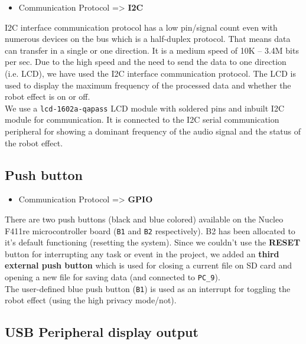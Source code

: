 \documentclass[11pt]{article}
\begin{document}
\begin{itemize}
\item Communication Protocol => \textbf{I2C}
\end{itemize}

I2C interface communication protocol has a low pin/signal count even with numerous devices on the bus which is a half-duplex protocol. That means data can transfer in a single or one direction. It is a medium speed of 10K – 3.4M bits per sec. Due to the high speed and the need to send the data to one direction (i.e. LCD), we have used the I2C interface communication protocol. The LCD is used to display the maximum frequency of the processed data and whether the robot effect is on or off. \\

We use a \texttt{lcd-1602a-qapass} LCD module with soldered pins and inbuilt I2C module for communication. It is connected to the I2C serial communication peripheral for showing a dominant frequency of the audio signal and the status of the robot effect.

\subsection{Push button}
\label{sec:org61b3168}

\begin{itemize}
\item Communication Protocol => \textbf{GPIO}
\end{itemize}

There are two push buttons (black and blue colored) available on the Nucleo F411re microcontroller board (\texttt{B1} and \texttt{B2} respectively). B2 has been allocated to it's default functioning (resetting the system). Since we couldn’t use the \textbf{RESET} button for interrupting any task or event in the project, we added an \textbf{third external push button} which is used for closing a current file on SD card and opening a new file for saving data (and connected to \texttt{PC\_9}). \\

The user-defined blue push button (\texttt{B1}) is used as an interrupt for toggling the robot effect (using the high privacy mode/not).

\subsection{USB Peripheral display output}
\label{sec:org1067e1e}
\end{document}
